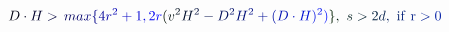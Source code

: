 \documentclass[12pt]{article}
\begin{document}
\makeatletter
\renewcommand*{\@textcolor}[3]{%
  \protect\leavevmode
  \begingroup
    \color#1{#2}#3%
  \endgroup
}
\makeatother
\begin{displaymath}
\mathcolor[RGB]{0,0,15}{D} \mathcolor[RGB]{0,0,30}{\cdot} \mathcolor[RGB]{0,0,45}{H} \mathcolor[RGB]{0,0,60}{>} \mathcolor[RGB]{0,0,75}{\operatorname*} { \mathcolor[RGB]{0,0,90}{m} \mathcolor[RGB]{0,0,105}{a} \mathcolor[RGB]{0,0,120}{x} } \mathcolor[RGB]{0,0,135}{\{} \mathcolor[RGB]{0,0,150}{4} \mathcolor[RGB]{0,0,165}{r} ^ { \mathcolor[RGB]{0,0,180}{2} } \mathcolor[RGB]{0,0,195}{+} \mathcolor[RGB]{0,0,210}{1} \mathcolor[RGB]{0,0,225}{,} \mathcolor[RGB]{0,0,240}{2} \mathcolor[RGB]{0,0,255}{r} \mathcolor[RGB]{0,15,0}{(} \mathcolor[RGB]{0,15,15}{v} ^ { \mathcolor[RGB]{0,15,30}{2} } \mathcolor[RGB]{0,15,45}{H} ^ { \mathcolor[RGB]{0,15,60}{2} } \mathcolor[RGB]{0,15,75}{-} \mathcolor[RGB]{0,15,90}{D} ^ { \mathcolor[RGB]{0,15,105}{2} } \mathcolor[RGB]{0,15,120}{H} ^ { \mathcolor[RGB]{0,15,135}{2} } \mathcolor[RGB]{0,15,150}{+} \mathcolor[RGB]{0,15,165}{(} \mathcolor[RGB]{0,15,180}{D} \mathcolor[RGB]{0,15,195}{\cdot} \mathcolor[RGB]{0,15,210}{H} \mathcolor[RGB]{0,15,225}{)} ^ { \mathcolor[RGB]{0,15,240}{2} } \mathcolor[RGB]{0,15,255}{)} \mathcolor[RGB]{0,30,0}{\}} \mathcolor[RGB]{0,30,15}{,} ~ \mathcolor[RGB]{0,30,30}{s} \mathcolor[RGB]{0,30,45}{>} \mathcolor[RGB]{0,30,60}{2} \mathcolor[RGB]{0,30,75}{d} \mathcolor[RGB]{0,30,90}{,} \mathrm { ~ \mathcolor[RGB]{0,30,105}{i} \mathcolor[RGB]{0,30,120}{f} ~ \mathcolor[RGB]{0,30,135}{r} \mathcolor[RGB]{0,30,150}{>} \mathcolor[RGB]{0,30,165}{0} }
\end{displaymath}
\end{document}
